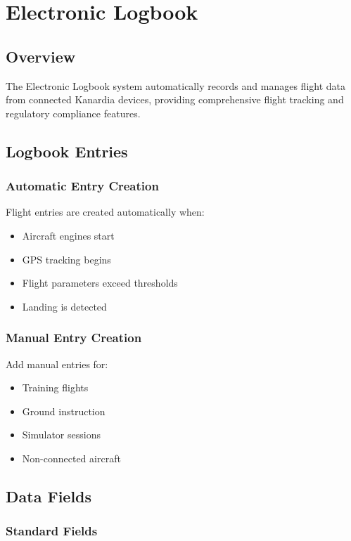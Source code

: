 \chapter{Electronic Logbook}

\section{Overview}

The Electronic Logbook system automatically records and manages flight data from connected Kanardia devices, providing comprehensive flight tracking and regulatory compliance features.

\section{Logbook Entries}

\subsection{Automatic Entry Creation}

Flight entries are created automatically when:
\begin{itemize}
    \item Aircraft engines start
    \item GPS tracking begins
    \item Flight parameters exceed thresholds
    \item Landing is detected
\end{itemize}

\subsection{Manual Entry Creation}

Add manual entries for:
\begin{itemize}
    \item Training flights
    \item Ground instruction
    \item Simulator sessions
    \item Non-connected aircraft
\end{itemize}

\section{Data Fields}

\subsection{Standard Fields}

